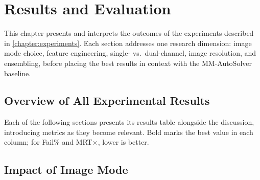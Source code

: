 
\chapter{Results and Evaluation}\label{chapter:results}

This chapter presents and interprets the outcomes of the experiments described in \autoref{chapter:experiments}.
Each section addresses one research dimension: image mode choice, feature engineering, single- vs.\ dual-channel, image resolution, and ensembling,
before placing the best results in context with the MM-AutoSolver baseline.

\section{Overview of All Experimental Results}\label{sec:results-overview}

Each of the following sections presents its results table alongside the discussion, introducing metrics as they become relevant.
Bold marks the best value in each column; for Fail\% and MRT$\times$, lower is better.

\section{Impact of Image Mode}\label{sec:results-image-mode}

